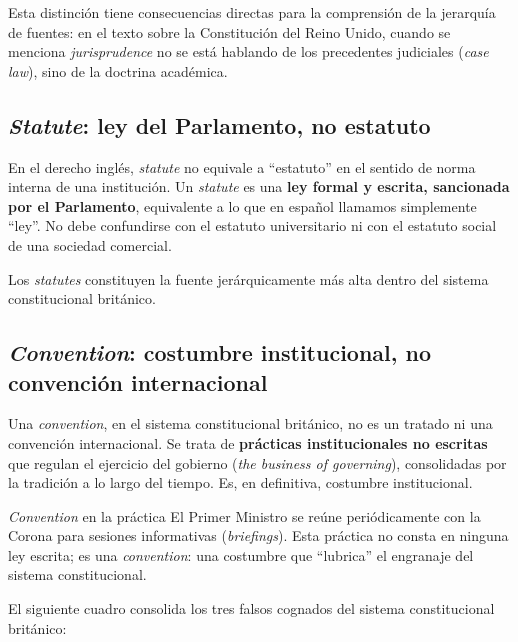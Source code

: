 \documentclass[12pt,oneside]{book}
\begin{document}
Esta distinción tiene consecuencias directas para la comprensión de la jerarquía de fuentes: en el texto sobre la Constitución del Reino Unido, cuando se menciona \textit{jurisprudence} no se está hablando de los precedentes judiciales (\textit{case law}), sino de la doctrina académica.

\subsection{\textit{Statute}: ley del Parlamento, no estatuto}

\begin{important}
En el derecho inglés, \textit{statute} no equivale a ``estatuto'' en el sentido de norma interna de una institución. Un \textit{statute} es una \textbf{ley formal y escrita, sancionada por el Parlamento}, equivalente a lo que en español llamamos simplemente ``ley''. No debe confundirse con el estatuto universitario ni con el estatuto social de una sociedad comercial.
\end{important}

Los \textit{statutes} constituyen la fuente jerárquicamente más alta dentro del sistema constitucional británico.

\subsection{\textit{Convention}: costumbre institucional, no convención internacional}

\begin{important}
Una \textit{convention}, en el sistema constitucional británico, no es un tratado ni una convención internacional. Se trata de \textbf{prácticas institucionales no escritas} que regulan el ejercicio del gobierno (\textit{the business of governing}), consolidadas por la tradición a lo largo del tiempo. Es, en definitiva, costumbre institucional.
\end{important}

\begin{example}{\textit{Convention} en la práctica}
El Primer Ministro se reúne periódicamente con la Corona para sesiones informativas (\textit{briefings}). Esta práctica no consta en ninguna ley escrita; es una \textit{convention}: una costumbre que ``lubrica'' el engranaje del sistema constitucional.
\end{example}

El siguiente cuadro consolida los tres falsos cognados del sistema constitucional británico:
\end{document}
